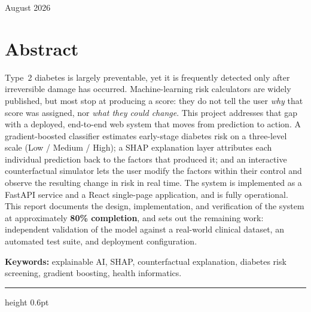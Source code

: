 \documentclass[11pt,a4paper]{article}
\newcommand{\ReportDate}{August 2026}
\begin{document}
\begin{titlepage}
\vfill
{}
\vspace{0.3cm}
{\normalsize \ReportDate\par}

\end{titlepage}

\setcounter{page}{2}

\section*{\color{accent}Abstract}
Type~2 diabetes is largely preventable, yet it is frequently detected only after
irreversible damage has occurred. Machine-learning risk calculators are widely
published, but most stop at producing a score: they do not tell the user
\emph{why} that score was assigned, nor \emph{what they could change}. This
project addresses that gap with a deployed, end-to-end web system that moves
from prediction to action. A gradient-boosted classifier estimates early-stage
diabetes risk on a three-level scale (Low / Medium / High); a SHAP explanation
layer attributes each individual prediction back to the factors that produced
it; and an interactive counterfactual simulator lets the user modify the
factors within their control and observe the resulting change in risk in real
time. The system is implemented as a FastAPI service and a React single-page
application, and is fully operational. This report documents the design,
implementation, and verification of the system at approximately \textbf{80\%
completion}, and sets out the remaining work: independent validation of the
model against a real-world clinical dataset, an automated test suite, and
deployment configuration.

\vspace{0.5em}
\noindent\textbf{Keywords:} explainable AI, SHAP, counterfactual explanation,
diabetes risk screening, gradient boosting, health informatics.

\vspace{0.8em}
{\color{accent}\hrule height 0.6pt}
\vspace{0.5em}

\renewcommand{\contentsname}{\color{accent}Table of Contents}
{\small\tableofcontents}
\end{document}
